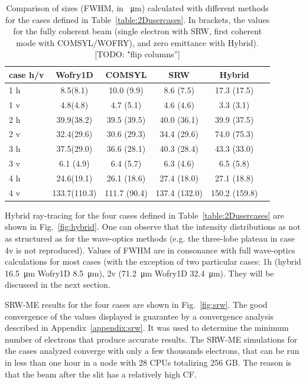 \documentclass{iucr}              %
\newcommand{\todo}[1]{{\color{red}[TODO: "#1'']}}
\begin{document}
\begin{table}[]
    \label{table:comparison}
    \caption{Comparison of sizes (FWHM, in \SI{}{\micro\meter}) calculated with different methods for the cases defined in Table~\ref{table:2Dusercases}.
    In brackets, the values for the fully coherent beam (single electron with SRW, first coherent mode with COMSYL/WOFRY), and zero emittance with Hybrid). \todo{flip columns}
    }
    \centering
    \begin{tabular}{p{}|c|c|c|c|c}
         case h/v &
         Wofry1D&
         COMSYL&
         SRW&
         Hybrid \\
         \hline
1 h  & 8.5(8.1)    & 10.0 (9.9)  & 8.6 (7.5)   & 17.3 (17.5) \\
1 v  & 4.8(4.8)    & 4.7 (5.1)   & 4.6 (4.6)   & 3.3 (3.1) \\
\hline
2 h  & 39.9(38.2)  & 39.5 (39.5) & 40.0 (36.1)  & 39.9 (37.5) \\
2 v  & 32.4(29.6)  & 30.6 (29.3) & 34.4 (29.6)  & 74.0 (75.3) \\
\hline
3 h  & 37.5(29.0)  & 36.6 (28.1) & 40.3 (28.4)  & 43.3 (33.0) \\
3 v  & 6.1 (4.9)   & 6.4 (5.7)   & 6.3 (4.6)    & 6.5 (5.8) \\
\hline
4 h  & 24.6(19.1)  & 26.1 (18.6)  & 27.4 (18.0)   & 27.1 (18.8) \\
4 v  & 133.7(110.3)& 111.7 (90.4) & 137.4 (132.0) & 150.2 (159.8) \\
    \end{tabular}
\end{table}

Hybrid ray-tracing for the four cases defined in Table~\ref{table:2Dusercases} are shown in  Fig.~\ref{fig:hybrid}. One can observe that the intensity distributions as not as structured as for the wave-optics methods (e.g. the three-lobe plateau in case 4v is not reproduced). Values of FWHM are in consonance with full wave-optics calculations for most cases (with the exception of two particular cases:
1h (hybrid \SI{16.5}{\micro\meter} Wofry1D \SI{8.5}{\micro\meter}),
2v (\SI{71.2}{\micro\meter} Wofry1D \SI{32.4}{\micro\meter}). They will be discussed in the next section.


SRW-ME results for the four cases are shown in Fig.~\ref{fig:srw}. The good convergence of the values displayed is guarantee by a convergence analysis described in Appendix~\ref{appendix:srw}.
It was used to determine the minimum number of electrons that produce accurate results. The SRW-ME simulations for the cases analyzed converge with only a few thousands electrons, that can be run in less than one hour in a node with 28 CPUs totalizing 256 GB. The reason is that the beam after the slit has a relatively high CF. 
\end{document}
